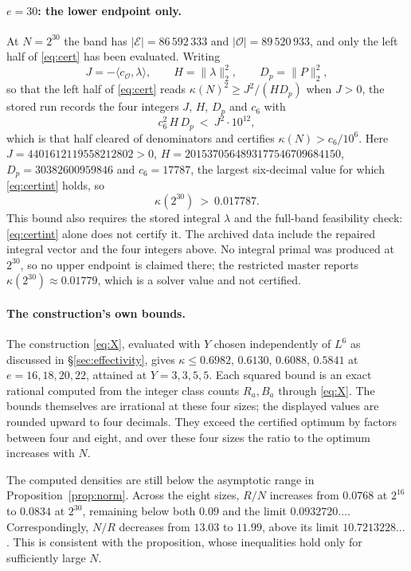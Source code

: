 \documentclass[11pt,a4paper]{article}
\theoremstyle{plain}
\theoremstyle{definition}
\theoremstyle{remark}
\newcommand{\vB}{\mathcal{E}}
\newcommand{\vR}{\mathcal{O}}
\begin{document}
\paragraph{$e=30$: the lower endpoint only.} At $N=2^{30}$ the band has $|\vB|=86\,592\,333$ and
$|\vR|=89\,520\,933$, and only the left half of \eqref{eq:cert} has been evaluated. Writing
\begin{equation}\label{eq:JHD}
  J=-\langle c_{\vR},\lambda\rangle,\qquad H=\|\lambda\|_{2}^{2},\qquad D_{p}=\|P\|_{2}^{2},
\end{equation}
so that the left half of \eqref{eq:cert} reads $\kappa(N)^{2}\ge J^{2}/(H D_{p})$ when $J>0$, the stored
run records the four integers $J$, $H$, $D_{p}$ and $c_{6}$ with
\begin{equation}\label{eq:certint}
  c_{6}^{2}\,H\,D_{p}\ <\ J^{2}\cdot10^{12} ,
\end{equation}
which is that half cleared of denominators and certifies $\kappa(N)>c_{6}/10^{6}$. Here
$J=4401612119558212802>0$, $H=2015370564893177546709684150$, $D_{p}=30382600959846$ and
$c_{6}=17787$, the largest six-decimal value for which \eqref{eq:certint} holds, so
\[
  \kappa(2^{30})\ >\ 0.017787 .
\]
This bound also requires the stored integral $\lambda$ and the full-band feasibility check:
\eqref{eq:certint} alone does not certify it. The archived data include the repaired integral vector
and the four integers above. No integral primal was
produced at $2^{30}$, so no upper endpoint is claimed there; the restricted master reports
$\kappa(2^{30})\approx0.01779$, which is a solver value and not certified.

\paragraph{The construction's own bounds.} The construction \eqref{eq:X}, evaluated with
$Y$ chosen independently of $L^6$ as discussed in \S\ref{sec:effectivity},
gives $\kappa\le0.6982,\,0.6130,\,0.6088,\,0.5841$ at $e=16,18,20,22$, attained at $Y=3,3,5,5$. Each squared bound is an exact rational computed from the integer class counts $R_a,B_a$
through \eqref{eq:X}. The bounds themselves are irrational at these four sizes; the displayed
values are rounded upward to four decimals. They exceed the certified optimum by factors between four and eight, and over
these four sizes the ratio to the optimum increases with $N$.

The computed densities are still below the asymptotic range in Proposition~\ref{prop:norm}.
Across the eight sizes, $R/N$ increases from $0.0768$ at $2^{16}$ to $0.0834$ at $2^{30}$,
remaining below both $0.09$ and the limit $0.0932720\ldots$.
Correspondingly, $N/R$ decreases from $13.03$ to $11.99$, above its limit $10.7213228\ldots$.
This is consistent with the proposition, whose inequalities hold only for sufficiently large $N$.
\end{document}
